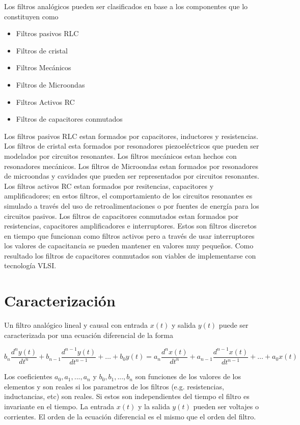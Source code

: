 \documentclass[12pt]{book}
\theoremstyle{definition}
\theoremstyle{remark}
\theoremstyle{plain}
\begin{document}
Los filtros analógicos pueden ser clasificados en base a los componentes que lo constituyen como

\begin{itemize}
\item Filtros pasivos RLC
\item Filtros de cristal
\item Filtros Mecánicos
\item Filtros de Microondas
\item Filtros Activos RC
\item Filtros de capacitores conmutados
\end{itemize}

Los filtros pasivos RLC estan formados por capacitores, inductores y resistencias. Los filtros de cristal esta formados por resonadores piezoeléctricos que pueden ser modelados por circuitos resonantes. Los filtros mecánicos estan hechos con resonadores mecánicos. Los filtros de Microondas estan formados por resonadores de microondas y cavidades que pueden ser representados por circuitos resonantes. Los filtros activos RC estan formados por resitencias, capacitores y amplificadores; en estos filtros, el comportamiento de los circuitos resonantes es simulado a través del uso de retroalimentaciones o por fuentes de energía para los circuitos pasivos. Los filtros de capacitores conmutados estan formados por resistencias, capacitores amplificadores e interruptores. Estos son filtros discretos en tiempo que funcionan como filtros activos pero a través de usar interruptores los valores de capacitancia se pueden mantener en valores muy pequeños. Como resultado los filtros de capacitores conmutados son viables de implementarse con tecnología VLSI.

\section{Caracterización}
Un filtro analógico lineal y causal con entrada $x(t)$ y salida $y(t)$ puede ser caracterizada por una ecuación diferencial de la forma

\begin{equation}
\label{equ28}
b_n \frac{d^n y(t)}{dt^n}+b_{n-1} \frac{d^{n-1} y(t)}{dt^{n-1}}+ \dotsc +b_0 y(t)= a_n \frac{d^n x(t)}{dt^n}+a_{n-1} \frac{d^{n-1} x(t)}{dt^{n-1}}+ \dotsc +a_0 x(t)
\end{equation}

Los coeficientes $a_0, a_1,..., a_n$ y $b_0, b_1,...,b_n$ son funciones de los valores de los elementos y son reales si los parametros de los filtros (e.g. resistencias, inductancias, etc) son reales. Si estos son independientes del tiempo el filtro es invariante en el tiempo. La entrada $x(t)$ y la salida $y(t)$ pueden ser voltajes o corrientes. El orden de la ecuación diferencial es el mismo que el orden del filtro.
\end{document}
